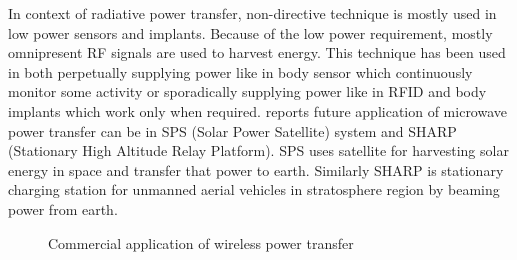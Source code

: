 \documentclass[12pt,a4paper,UKenglish]{report}
\begin{document}
In context of radiative power transfer, non-directive technique is mostly used in low power sensors and implants. 
Because of the low power requirement, mostly omnipresent RF signals are used to harvest energy. This technique 
has been used in both perpetually supplying power like in body sensor which continuously monitor some activity 
or sporadically supplying power like in RFID and body implants which work only when required. \cite{wpt_fund_std} reports 
future application of microwave power transfer can be in SPS (Solar Power Satellite) system and SHARP (Stationary 
High Altitude Relay Platform). SPS uses satellite for harvesting solar energy in space and transfer that power 
to earth. Similarly SHARP is stationary charging station for unmanned aerial vehicles in stratosphere region by 
beaming power from earth.    \\

\begin{figure} [htbp]
  \begin{minipage}{\linewidth}
  \centering 
  \hfill
 \hfill
 \end{minipage}\par\medskip
 \centering
 \caption{Commercial application of wireless power transfer} 
\label{wpt_application} 
\end{figure}
\end{document}
